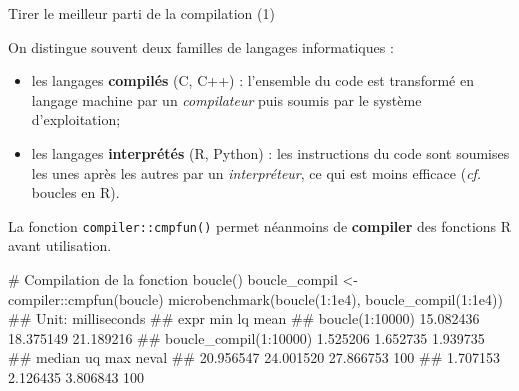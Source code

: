 \documentclass[12pt,ignorenonframetext,]{beamer}
\newenvironment{Shaded}{}{}
\newcommand{\KeywordTok}[1]{\textcolor[rgb]{0.00,0.00,1.00}{#1}}
\newcommand{\DecValTok}[1]{#1}
\newcommand{\FloatTok}[1]{#1}
\newcommand{\StringTok}[1]{\textcolor[rgb]{0.00,0.50,0.50}{#1}}
\newcommand{\CommentTok}[1]{\textcolor[rgb]{0.00,0.50,0.00}{#1}}
\newcommand{\OperatorTok}[1]{#1}
\newcommand{\NormalTok}[1]{#1}
\providecommand{\tightlist}{%
  \setlength{\itemsep}{0pt}\setlength{\parskip}{0pt}}
\renewenvironment{Shaded}{\begin{snugshade}}{\end{snugshade}}
\begin{document}
\begin{frame}[fragile]{Tirer le meilleur parti de la compilation (1)}

On distingue souvent deux familles de langages informatiques :

\begin{itemize}
\tightlist
\item
  \pause \vspace{-0.2cm} les langages \textbf{compilés} (C, C++) :
  l'ensemble du code est transformé en langage machine par un
  \emph{compilateur} puis soumis par le système d'exploitation;
\item
  \pause les langages \textbf{interprétés} (R, Python) : les
  instructions du code sont soumises les unes après les autres par un
  \emph{interpréteur}, ce qui est moins efficace (\emph{cf.} boucles en
  R).
\end{itemize}

\vspace{0.1cm} \pause La fonction \texttt{compiler::cmpfun()} permet
néanmoins de \textbf{compiler} des fonctions R avant utilisation.

\pause \footnotesize \vspace{-0.2cm}

\begin{Shaded}
\begin{Highlighting}[]
\CommentTok{# Compilation de la fonction boucle()}
\NormalTok{boucle_compil <-}\StringTok{ }\NormalTok{compiler}\OperatorTok{::}\KeywordTok{cmpfun}\NormalTok{(boucle)}
\KeywordTok{microbenchmark}\NormalTok{(}\KeywordTok{boucle}\NormalTok{(}\DecValTok{1}\OperatorTok{:}\FloatTok{1e4}\NormalTok{), }\KeywordTok{boucle_compil}\NormalTok{(}\DecValTok{1}\OperatorTok{:}\FloatTok{1e4}\NormalTok{))}
\NormalTok{  ## Unit: milliseconds}
\NormalTok{  ##                    expr       min        lq      mean}
\NormalTok{  ##         boucle(1:10000) 15.082436 18.375149 21.189216}
\NormalTok{  ##  boucle_compil(1:10000)  1.525206  1.652735  1.939735}
\NormalTok{  ##     median        uq       max neval}
\NormalTok{  ##  20.956547 24.001520 27.866753   100}
\NormalTok{  ##   1.707153  2.126435  3.806843   100}
\end{Highlighting}
\end{Shaded}

\end{frame}
\end{document}
